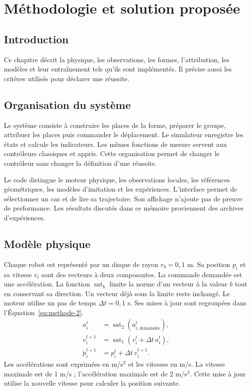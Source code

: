 \chapter{Méthodologie et solution proposée}
\label{chap:methode}

\section{Introduction}
Ce chapitre décrit la physique, les observations, les formes, l'attribution, les modèles et leur entraînement tels qu'ils sont implémentés. Il précise aussi les critères utilisés pour déclarer une réussite.

\section{Organisation du système}
Le système consiste à construire les places de la forme, préparer le groupe, attribuer les places puis commander le déplacement. Le simulateur enregistre les états et calcule les indicateurs. Les mêmes fonctions de mesure servent aux contrôleurs classiques et appris. Cette organisation permet de changer le contrôleur sans changer la définition d'une réussite.

Le code distingue le moteur physique, les observations locales, les références géométriques, les modèles d'imitation et les expériences. L'interface permet de sélectionner un cas et de lire sa trajectoire. Son affichage n'ajoute pas de preuve de performance. Les résultats discutés dans ce mémoire proviennent des archives d'expériences.

\section{Modèle physique}
Chaque robot est représenté par un disque de rayon $r_b=0{,}1$ m. Sa position $p_i$ et sa vitesse $v_i$ sont des vecteurs à deux composantes. La commande demandée est une accélération. La fonction $\operatorname{sat}_b$ limite la norme d'un vecteur à la valeur $b$ tout en conservant sa direction. Un vecteur déjà sous la limite reste inchangé.
Le moteur utilise un pas de temps $\Delta t=0{,}1$ s. Ses mises à jour sont regroupées dans l'Équation~\eqref{eq:methode-2}.
\begin{equation}\begin{aligned}
a_i^t&=\operatorname{sat}_{2}(a_{i,\text{demandée}}^t),\\
v_i^{t+1}&=\operatorname{sat}_{1}(v_i^t+\Delta t\,a_i^t),\\
\widetilde p_i^{t+1}&=p_i^t+\Delta t\,v_i^{t+1}.
\end{aligned}\label{eq:methode-2}
\end{equation}
Les accélérations sont exprimées en m/s$^2$ et les vitesses en m/s. La vitesse maximale est de 1 m/s ; l'accélération maximale est de 2 m/s$^2$. Cette mise à jour utilise la nouvelle vitesse pour calculer la position suivante.

